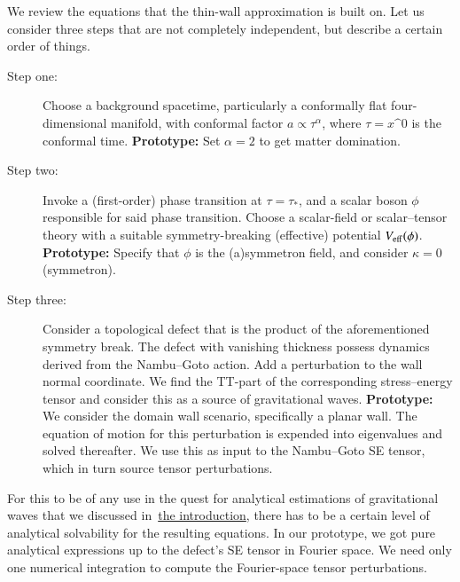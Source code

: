 









We review the equations that the thin-wall approximation is built on. %
Let us consider three steps that are not completely independent, but describe a certain order of things.
\begin{description}
    \item[Step one:] Choose a background spacetime, particularly a conformally flat four-dimensional manifold, with conformal factor $a\propto \tau^\alpha$, where $\tau=x\^0$ is the conformal time. \textbf{Prototype:} Set $\alpha=2$ to get matter domination.
    \item[Step two:] Invoke a (first-order) phase transition at $\tau = \tau_\ast$, and a scalar boson $\phi$ responsible for said phase transition. Choose a scalar-field or scalar--tensor theory with a suitable symmetry-breaking (effective) potential $V_\mathrm{eff}(\phi)$. \textbf{Prototype:} Specify that $\phi$ is the (a)symmetron field, and consider $\kappa=0$ (symmetron).
    \item[Step three:] Consider a topological defect that is the product of the aforementioned symmetry break. The defect with vanishing thickness possess dynamics derived from the Nambu--Goto action. Add a perturbation to the wall normal coordinate. We find the TT-part of the corresponding stress--energy tensor and consider this as a source of gravitational waves. \textbf{Prototype:} We consider the domain wall scenario, specifically a planar wall. The equation of motion for this perturbation is expended into eigenvalues and solved thereafter. We use this as input to the Nambu--Goto SE tensor, which in turn source tensor perturbations.
\end{description}
For this to be of any use in the quest for analytical estimations of gravitational waves that we discussed in~\hyperlink{sentence1}{the introduction}, there has to be a certain level of analytical solvability for the resulting equations. In our prototype, we got pure analytical expressions up to the defect's SE tensor in Fourier space. We need only one numerical integration to compute the Fourier-space tensor perturbations. \blahblah {}






